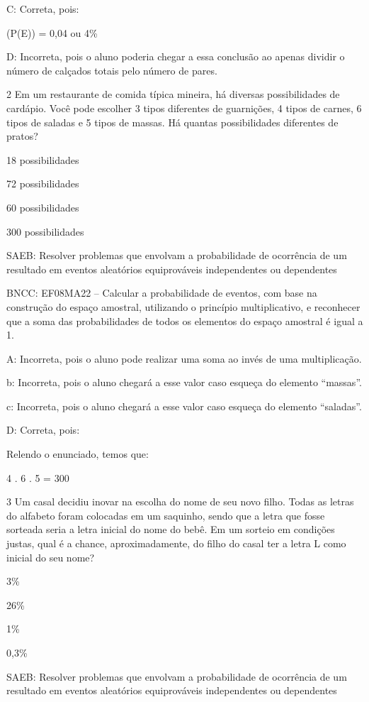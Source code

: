 {C: Correta, pois:

(P(E)) = 0,04 ou 4\%

D: Incorreta, pois o aluno poderia chegar a essa conclusão ao apenas
dividir o número de calçados totais pelo número de pares.

\num{2} Em um restaurante de comida típica mineira, há diversas
possibilidades de cardápio. Você pode escolher 3 tipos diferentes de
guarnições, 4 tipos de carnes, 6 tipos de saladas e 5 tipos de massas.
Há quantas possibilidades diferentes de pratos?
\item 18 possibilidades
\item 72 possibilidades
\item 60 possibilidades
\item 300 possibilidades

SAEB: Resolver problemas que envolvam a probabilidade de ocorrência de
um resultado em eventos aleatórios equiprováveis independentes ou
dependentes

BNCC: EF08MA22 -- Calcular a probabilidade de eventos, com base na
construção do espaço amostral, utilizando o princípio multiplicativo, e
reconhecer que a soma das probabilidades de todos os elementos do espaço
amostral é igual a 1.

A: Incorreta, pois o aluno pode realizar uma soma ao invés de uma
multiplicação.

b: Incorreta, pois o aluno chegará a esse valor caso esqueça do elemento
``massas''.

c: Incorreta, pois o aluno chegará a esse valor caso esqueça do elemento
``saladas''.

D: Correta, pois:

Relendo o enunciado, temos que:

4 . 6 . 5 = 300

\num{3} Um casal decidiu inovar na escolha do nome de seu novo filho. Todas
as letras do alfabeto foram colocadas em um saquinho, sendo que a letra
que fosse sorteada seria a letra inicial do nome do bebê. Em um sorteio
em condições justas, qual é a chance, aproximadamente, do filho do casal
ter a letra L como inicial do seu nome?
\item 3\%
\item 26\%
\item 1\%
\item 0,3\%


SAEB: Resolver problemas que envolvam a probabilidade de ocorrência de
um resultado em eventos aleatórios equiprováveis independentes ou
dependentes

}

